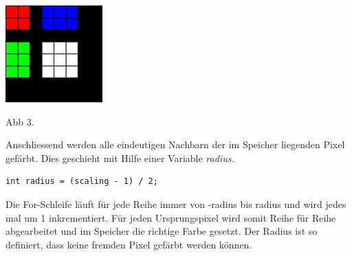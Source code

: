 \documentclass[course=erap]{aspdoc}
\begin{document}
\centering
\includegraphics[width=0.28\textwidth]{"2x2_2"}
\begin{center}
\vspace{-0.5em}
  Abb 3.
\vspace{-0.5em}
\end{center}
\justify
Anschliessend werden alle eindeutigen Nachbarn der im Speicher liegenden Pixel gefärbt. Dies geschieht mit Hilfe einer Variable {\textit{radius.}} 
\begin{lstlisting}
int radius = (scaling - 1) / 2;
\end{lstlisting}
Die For-Schleife läuft für jede Reihe immer von -radius bis radius und wird jedes mal um 1 inkrementiert.
Für jeden Ursprungspixel wird somit Reihe für Reihe abgearbeitet und im Speicher die richtige Farbe gesetzt. Der Radius ist so definiert, dass keine fremden Pixel gefärbt werden können. 
\end{document}
